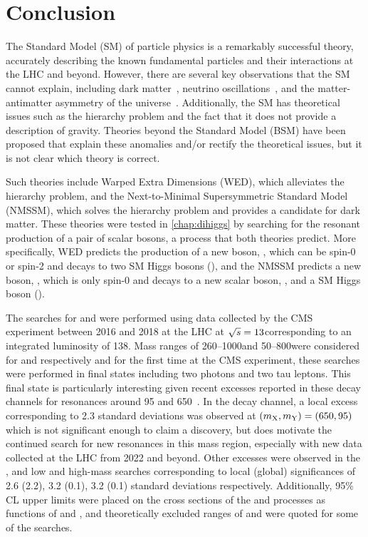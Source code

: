 \chapter{Conclusion}\label{chap:conclusion}
The Standard Model (SM) of particle physics is a remarkably successful theory, accurately describing the known fundamental particles and their interactions at the LHC and beyond. However, there are several key observations that the SM cannot explain, including dark matter~\cite{Clowe:2006eq}, neutrino oscillations~\cite{Super-Kamiokande:1998kpq}, and the matter-antimatter asymmetry of the universe~\cite{Canetti:2012zc}. Additionally, the SM has theoretical issues such as the hierarchy problem and the fact that it does not provide a description of gravity. Theories beyond the Standard Model (BSM) have been proposed that explain these anomalies and/or rectify the theoretical issues, but it is not clear which theory is correct. 

Such theories include Warped Extra Dimensions (WED), which alleviates the hierarchy problem, and the Next-to-Minimal Supersymmetric Standard Model (NMSSM), which solves the hierarchy problem and provides a candidate for dark matter. These theories were tested in \cref{chap:dihiggs} by searching for the resonant production of a pair of scalar bosons, a process that both theories predict. More specifically, WED predicts the production of a new boson, \PX, which can be spin-0 or spin-2 and decays to two SM Higgs bosons (\XHH), and the NMSSM predicts a new boson, \PX, which is only spin-0 and decays to a new scalar boson, \PY, and a SM Higgs boson (\XYH). 

The searches for \XHH and \XYH were performed using data collected by the CMS experiment between 2016 and 2018 at the LHC at $\sqrt{s}=13$\TeV corresponding to an integrated luminosity of 138\fbinv. Mass ranges of 260--1000\GeV and 50--800\GeV were considered for \mX and \mY respectively and for the first time at the CMS experiment, these searches were performed in final states including two photons and two tau leptons. This final state is particularly interesting given recent excesses reported in these decay channels for resonances around 95 and 650\GeV~\cite{CMS:2022bcb,CMS:2022goy,CMS:2024yhz}. In the \Ygg decay channel, a local excess corresponding to 2.3 standard deviations was observed at $(m_{\mathrm{X}},m_{\mathrm{Y}}) = (650,95)$\GeV which is not significant enough to claim a discovery, but does motivate the continued search for new resonances in this mass region, especially with new data collected at the LHC from 2022 and beyond. Other excesses were observed in the \XYttHgg, and low and high-mass \XYggHtt searches corresponding to local (global) significances of 2.6 (2.2), 3.2 (0.1), 3.2 (0.1) standard deviations respectively. Additionally, 95\% CL upper limits were placed on the cross sections of the \XHH and \XYH processes as functions of \mX and \mY, and theoretically excluded ranges of \mX and \mY were quoted for some of the searches.

